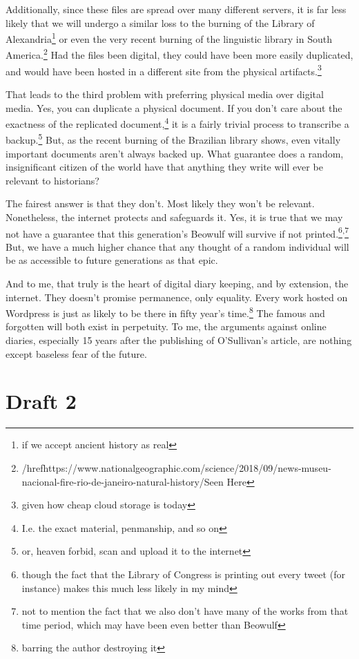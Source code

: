 \documentclass[12pt]{article}[titlepage]
\newcommand{\1}{\={a}}
\newcommand{\2}{\={e}}
\newcommand{\3}{\={\i}}
\newcommand{\4}{\=o}
\newcommand{\5}{\=u}
\newcommand{\6}{\={A}}
\renewcommand{\,}{\textsuperscript{,}}
\begin{document}
Additionally, since these files are spread over many different servers, it is far less likely that we will undergo a similar loss to the burning of the Library of Alexandria\footnote{if we accept ancient history as real} or even the very recent burning of the linguistic library in South America.\footnote{/href{https://www.nationalgeographic.com/science/2018/09/news-museu-nacional-fire-rio-de-janeiro-natural-history/}{Seen Here}}
Had the files been digital, they could have been more easily duplicated, and would have been hosted in a different site from the physical artifacts.\footnote{given how cheap cloud storage is today}

That leads to the third problem with preferring physical media over digital media.
Yes, you can duplicate a physical document.
If you don’t care about the exactness of the replicated document,\footnote{I.e. the exact material, penmanship, and so on} it is a fairly trivial process to transcribe a backup.\footnote{or, heaven forbid, scan and upload it to the internet}
But, as the recent burning of the Brazilian library shows, even vitally important documents aren’t always backed up.
What guarantee does a random, insignificant citizen of the world have that anything they write will ever be relevant to historians?

The fairest answer is that they don’t.
Most likely they won’t be relevant.
Nonetheless, the internet protects and safeguards it.
Yes, it is true that we may not have a guarantee that this generation’s Beowulf will survive if not printed.\footnote{though the fact that the Library of Congress is printing out every tweet (for instance) makes this much less likely in my mind}\,\footnote{not to mention the fact that we also don’t have many of the works from that time period, which may have been even better than Beowulf}
But, we have a much higher chance that any thought of a random individual will be as accessible to future generations as that epic.

And to me, that truly is the heart of digital diary keeping, and by extension, the internet.
They doesn’t promise permanence, only equality.
Every work hosted on Wordpress is just as likely to be there in fifty year’s time.\footnote{barring the author destroying it}
The famous and forgotten will both exist in perpetuity.
To me, the arguments against online diaries, especially 15 years after the publishing of O’Sullivan’s article, are nothing except baseless fear of the future.

\section{Draft 2}
\end{document}
